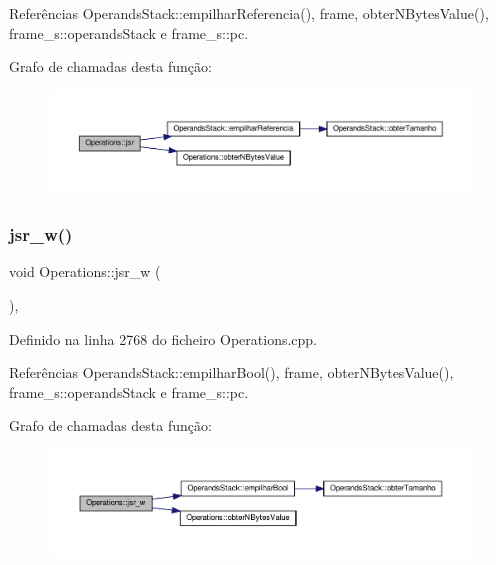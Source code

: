 Referências Operands\+Stack\+::empilhar\+Referencia(), frame, obter\+N\+Bytes\+Value(), frame\+\_\+s\+::operands\+Stack e frame\+\_\+s\+::pc.

Grafo de chamadas desta função\+:
\nopagebreak
\begin{figure}[H]
\begin{center}
\leavevmode
\includegraphics[width=350pt]{classOperations_a63c3ab8fef60a8a19ee336cb3d86f9aa_cgraph}
\end{center}
\end{figure}
\mbox{\label{classOperations_a22241dabd3678c4ab77bbe5882c3a4db}} 
\subsubsection{\texorpdfstring{jsr\+\_\+w()}{jsr\_w()}}
{\footnotesize\ttfamily void Operations\+::jsr\+\_\+w (\begin{DoxyParamCaption}{ }\end{DoxyParamCaption})\hspace{0.3cm}{\ttfamily [static]}, {\ttfamily [private]}}



Definido na linha 2768 do ficheiro Operations.\+cpp.



Referências Operands\+Stack\+::empilhar\+Bool(), frame, obter\+N\+Bytes\+Value(), frame\+\_\+s\+::operands\+Stack e frame\+\_\+s\+::pc.

Grafo de chamadas desta função\+:
\nopagebreak
\begin{figure}[H]
\begin{center}
\leavevmode
\includegraphics[width=350pt]{classOperations_a22241dabd3678c4ab77bbe5882c3a4db_cgraph}
\end{center}
\end{figure}
\mbox{\label{classOperations_aab1532a2f22ab943a1ec37e33ae742b3}} 
